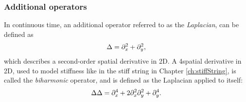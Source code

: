 \subsubsection{Additional operators}
In continuous time, an additional operator referred to as the \textit{Laplacian}, can be defined as
\begin{equation}\label{eq:laplacian}
    \Delta = \partial_x^2 + \partial_y^2,
\end{equation}
which describes a second-order spatial derivative in 2D. A 4\thOrder spatial derivative in 2D, used to model stiffness like in the stiff string in Chapter \ref{ch:stiffString}, is called the \textit{biharmonic} operator, and is defined as the Laplacian applied to itself:
\begin{equation}\label{eq:biharmonic}
    \Delta\Delta = \partial_x^4 + 2\partial_x^2\partial_y^2 +  \partial_y^4.
\end{equation}

